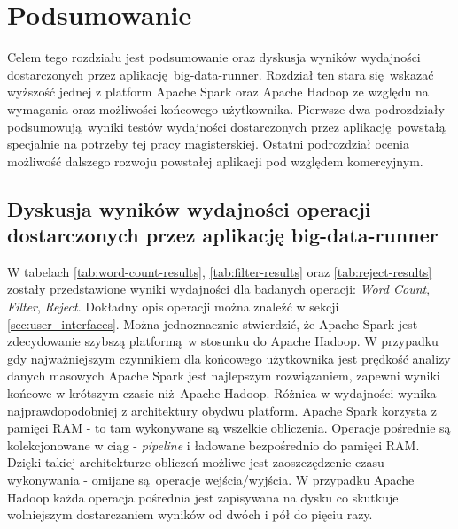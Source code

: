 \chapter{Podsumowanie} \label{chap.summary}
Celem tego rozdziału jest podsumowanie oraz dyskusja wyników wydajności dostarczonych przez aplikację big-data-runner. Rozdział ten stara się wskazać wyższość jednej z platform Apache Spark oraz Apache Hadoop ze względu na wymagania oraz możliwości końcowego użytkownika. Pierwsze dwa podrozdziały podsumowują wyniki testów wydajności dostarczonych przez aplikację powstałą specjalnie na potrzeby tej pracy magisterskiej. Ostatni podrozdział ocenia możliwość dalszego rozwoju powstałej aplikacji pod względem komercyjnym.   
\section{Dyskusja wyników wydajności operacji dostarczonych przez aplikację big-data-runner}
W tabelach \ref{tab:word-count-results}, \ref{tab:filter-results} oraz \ref{tab:reject-results} zostały przedstawione wyniki wydajności dla badanych operacji: \textit{Word Count}, \textit{Filter}, \textit{Reject}. Dokładny opis operacji można znaleźć w sekcji \ref{sec:user_interfaces}. Można jednoznacznie stwierdzić, że Apache Spark jest zdecydowanie szybszą platformą w stosunku do Apache Hadoop. W przypadku gdy najważniejszym czynnikiem dla końcowego użytkownika jest prędkość analizy danych masowych Apache Spark jest najlepszym rozwiązaniem, zapewni wyniki końcowe w krótszym czasie niż Apache Hadoop. Różnica w wydajności wynika najprawdopodobniej z architektury obydwu platform. Apache Spark korzysta z pamięci RAM - to tam wykonywane są wszelkie obliczenia. Operacje pośrednie są kolekcjonowane w ciąg - \textit{pipeline} i ładowane bezpośrednio do pamięci RAM. Dzięki takiej architekturze obliczeń możliwe jest zaoszczędzenie czasu wykonywania - omijane są operacje wejścia/wyjścia. W przypadku Apache Hadoop każda operacja pośrednia jest zapisywana na dysku co skutkuje wolniejszym dostarczaniem wyników od dwóch i pół do pięciu razy.
